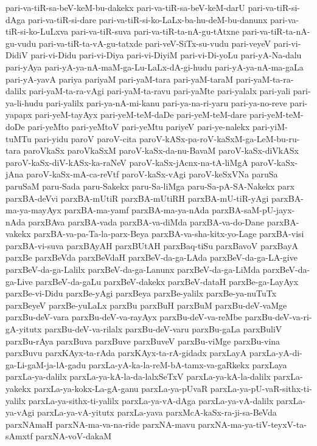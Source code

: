 {pari-va-tiR-sa-beV-keM-bu-dakekx
pari-va-tiR-sa-beV-keM-darU
pari-va-tiR-si-dAga
pari-va-tiR-si-dare
pari-va-tiR-si-ko-LaLx-ba-hu-deM-bu-danunx
pari-va-tiR-si-ko-LuLxva
pari-va-tiR-suva
pari-va-tiR-ta-nA-gu-tAtxne
pari-va-tiR-ta-nA-gu-vudu
pari-va-tiR-ta-vA-gu-tatxde
pari-veV-SiTx-su-vudu
pari-veyeV
pari-vi-DidiV
pari-vi-Didu
pari-vi-Diya
pari-vi-DiyiM
pari-vi-Di-yoLu
pari-yA-Na-dalu
pari-yAya
pari-yA-ya-nA-maM-ga-Lu-LaLx-dA-gi-hudu
pari-yA-ya-nA-ma-gaLa
pari-yA-yavA
pariya
pariyaM
pari-yaM-tara
pari-yaM-taraM
pari-yaM-ta-ra-dalilx
pari-yaM-ta-ra-vAgi
pari-yaM-ta-ravu
pari-yaMte
pari-yalalx
pari-yali
pari-ya-li-hudu
pari-yalilx
pari-ya-nA-mi-kanu
pari-ya-na-ri-yaru
pari-ya-no-reve
pari-yapapx
pari-yeM-tayAyx
pari-yeM-teM-daDe
pari-yeM-teM-dare
pari-yeM-teM-doDe
pari-yeMto
pari-yeMtoV
pari-yeMtu
pariyeV
pari-ye-nalekx
pari-yiM-tuMTu
pari-yidu
paroV
paroV-cita
paroV-kASx-pa-roV-kaSxM-ga-LeM-bu-ru-tara
paroVkaSx
paroVkaSxM
paroV-kaSx-da-nu-BavaM
paroV-kaSx-diVkASx
paroV-kaSx-diV-kASx-ka-raNeV
paroV-kaSx-jAcnx-na-tA-liMgA
paroV-kaSx-jAna
paroV-kaSx-mA-ca-reVtf
paroV-kaSx-vAgi
paroV-keSxVNa
paruSa
paruSaM
paru-Sada
paru-Sakekx
paru-Sa-liMga
paru-Sa-pA-SA-Nakekx
parx
parxBA-deVvi
parxBA-mUtiR
parxBA-mUtiRH
parxBA-mU-tiR-yAgi
parxBA-ma-ya-mayAyx
parxBA-ma-yamf
parxBA-ma-ya-nAda
parxBA-saM-pU-jayx-nAda
parxBAva
parxBA-vada
parxBA-va-diMda
parxBA-va-do-Dane
parxBA-vakekx
parxBA-va-pa-Ta-la-parx-Beya
parxBA-va-sha-kitx-yo-Lage
parxBA-visi
parxBA-vi-suva
parxBAyAH
parxBUtAH
parxBaq-tiSu
parxBavoV
parxBayA
parxBe
parxBeVda
parxBeVdaH
parxBeV-da-ga-LAda
parxBeV-da-ga-LA-give
parxBeV-da-ga-Lalilx
parxBeV-da-ga-Lanunx
parxBeV-da-ga-LiMda
parxBeV-da-ga-Live
parxBeV-da-gaLu
parxBeV-dakekx
parxBeV-dataH
parxBe-ga-LayAyx
parxBe-vi-Didu
parxBe-yAgi
parxBeya
parxBe-yalilx
parxBe-ya-nuTuTx
parxBeyeV
parxBe-yuLaLx
parxBu
parxBuH
parxBuM
parxBu-deV-vaMge
parxBu-deV-vara
parxBu-deV-va-rayAyx
parxBu-deV-va-reMbe
parxBu-deV-va-ri-gA-yitutx
parxBu-deV-va-rilalx
parxBu-deV-varu
parxBu-gaLa
parxBuliV
parxBu-rAya
parxBuva
parxBuve
parxBuveV
parxBu-viMge
parxBu-vina
parxBuvu
parxKAyx-ta-rAda
parxKAyx-ta-rA-gidadx
parxLayA
parxLa-yA-di-ga-Li-gaM-ja-lA-gadu
parxLa-yA-ka-la-reM-bA-tamx-va-gaRkekx
parxLaya
parxLa-ya-dalilx
parxLa-ya-kA-la-da-lalxSeTxV
parxLa-ya-kA-la-dalilx
parxLa-yakekx
parxLa-ya-kokx-La-gA-ganu
parxLa-ya-pUvaR
parxLa-ya-pU-vaR-sithx-ti-yalilx
parxLa-ya-sithx-ti-yalilx
parxLa-ya-vA-dAga
parxLa-ya-vA-dalilx
parxLa-ya-vAgi
parxLa-ya-vA-yitutx
parxLa-yava
parxMcA-kaSx-ra-ji-sa-BeVda
parxNAmaH
parxNA-ma-va-na-ride
parxNA-mavu
parxNA-ma-ya-tiV-teyxV-ta-sAmxtf
parxNA-voV-dakaM
}
